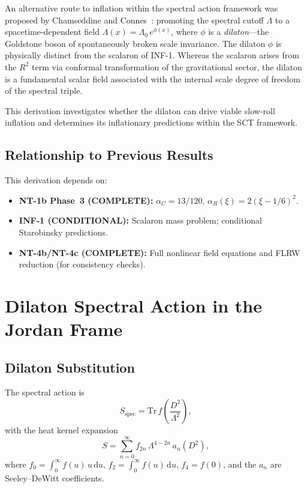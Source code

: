\documentclass[11pt,a4paper]{article}
\renewcommand{\dd}{\mathrm{d}}
\theoremstyle{plain}
\theoremstyle{definition}
\begin{document}
An alternative route to inflation within the spectral action framework
was proposed by Chamseddine and Connes~\cite{CC06}: promoting the
spectral cutoff $\Lambda$ to a spacetime-dependent field
$\Lambda(x) = \Lambda_0\,e^{\phi(x)}$, where $\phi$ is a
\emph{dilaton}---the Goldstone boson of spontaneously broken scale
invariance.  The dilaton $\phi$ is physically distinct from the
scalaron of INF-1.  Whereas the scalaron arises from the $R^2$ term
via conformal transformation of the gravitational sector, the dilaton
is a fundamental scalar field associated with the internal scale
degree of freedom of the spectral triple.

This derivation investigates whether the dilaton can drive viable
slow-roll inflation and determines its inflationary predictions within
the SCT framework.

\subsection{Relationship to Previous Results}

This derivation depends on:
\begin{itemize}[nosep]
  \item \textbf{NT-1b Phase~3 (COMPLETE):} $\alpha_C = 13/120$,
    $\alpha_R(\xi) = 2(\xi-1/6)^2$.
  \item \textbf{INF-1 (CONDITIONAL):} Scalaron mass problem;
    conditional Starobinsky predictions.
  \item \textbf{NT-4b/NT-4c (COMPLETE):} Full nonlinear field
    equations and FLRW reduction (for consistency checks).
\end{itemize}

\section{Dilaton Spectral Action in the Jordan Frame}\label{sec:jordan}

\subsection{Dilaton Substitution}

The spectral action is
\begin{equation}\label{eq:spectral-action}
  S_{\mathrm{spec}} = \mathrm{Tr}\,f\!\left(\frac{D^2}{\Lambda^2}\right),
\end{equation}
with the heat kernel expansion
\begin{equation}\label{eq:HK-expansion}
  S = \sum_{n=0}^{\infty} f_{2n}\,\Lambda^{4-2n}\,a_n(D^2),
\end{equation}
where $f_0 = \int_0^\infty f(u)\,u\,\dd u$,
$f_2 = \int_0^\infty f(u)\,\dd u$, $f_4 = f(0)$, and the $a_n$
are Seeley--DeWitt coefficients.
\end{document}
